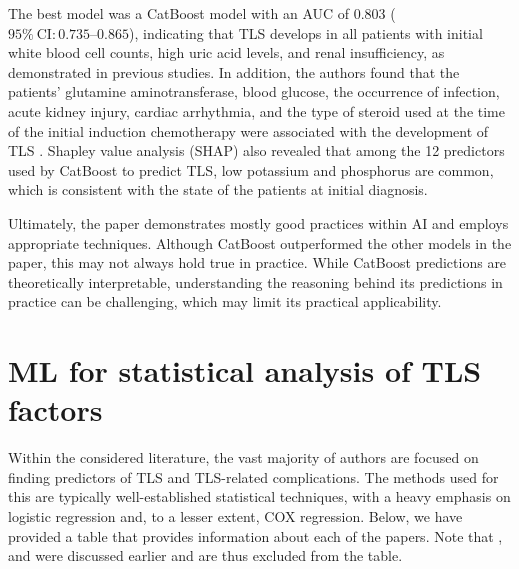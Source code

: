 \documentclass{article}
\begin{document}
The best model was a CatBoost model with an AUC of 0.803 ($95\%\ \text{CI}:0.735\text{–}0.865$), indicating that TLS develops in all patients with initial white blood cell counts, high uric acid levels, and renal insufficiency, as demonstrated in previous studies. In addition, the authors found that the patients’ glutamine aminotransferase, blood glucose, the occurrence of infection, acute kidney injury, cardiac arrhythmia, and the type of steroid used at the time of the initial induction chemotherapy were associated with the development of TLS . Shapley value analysis (SHAP) also revealed that among the 12 predictors used by CatBoost to predict TLS, low potassium and phosphorus are common, which is consistent with the state of the patients at initial diagnosis.

Ultimately, the paper demonstrates mostly good practices within AI and employs appropriate techniques.  Although CatBoost outperformed the other models in the paper, this may not always hold true in practice. While CatBoost predictions are theoretically interpretable, understanding the reasoning behind its predictions in practice can be challenging, which may limit its practical applicability.

\section{ML for statistical analysis of TLS factors}


Within the considered literature, the vast majority of authors are focused on finding predictors of TLS and TLS-related complications. The methods used for this are typically well-established statistical techniques, with a heavy emphasis on logistic regression and, to a lesser extent, COX regression. Below, we have provided a table that provides information about each of the papers. Note that \cite{montesinos2008tumor}, 
\cite{mato2004predictive} and  \cite{xiao2024prediction} were discussed earlier and are thus excluded from the table.
\end{document}
